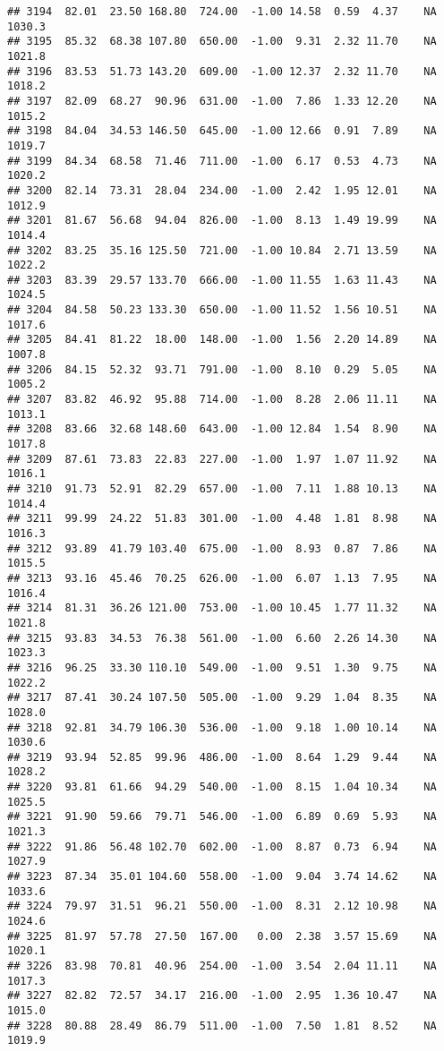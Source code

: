 \documentclass{article}\usepackage{graphicx, color}
\makeatletter
\newenvironment{kframe}{%
 \def\at@end@of@kframe{}%
 \ifinner\ifhmode%
  \def\at@end@of@kframe{\end{minipage}}%
  \begin{minipage}{\columnwidth}%
 \fi\fi%
 \def\FrameCommand##1{\hskip\@totalleftmargin \hskip-\fboxsep
 \colorbox{shadecolor}{##1}\hskip-\fboxsep
     \hskip-\linewidth \hskip-\@totalleftmargin \hskip\columnwidth}%
 \MakeFramed {\advance\hsize-\width
   \@totalleftmargin\z@ \linewidth\hsize
   \@setminipage}}%
 {\par\unskip\endMakeFramed%
 \at@end@of@kframe}
\newenvironment{knitrout}{}{} %
\makeatother
\begin{document}
\begin{knitrout}
\begin{kframe}
\begin{verbatim}
## 3194  82.01  23.50 168.80  724.00  -1.00 14.58  0.59  4.37    NA 1030.3
## 3195  85.32  68.38 107.80  650.00  -1.00  9.31  2.32 11.70    NA 1021.8
## 3196  83.53  51.73 143.20  609.00  -1.00 12.37  2.32 11.70    NA 1018.2
## 3197  82.09  68.27  90.96  631.00  -1.00  7.86  1.33 12.20    NA 1015.2
## 3198  84.04  34.53 146.50  645.00  -1.00 12.66  0.91  7.89    NA 1019.7
## 3199  84.34  68.58  71.46  711.00  -1.00  6.17  0.53  4.73    NA 1020.2
## 3200  82.14  73.31  28.04  234.00  -1.00  2.42  1.95 12.01    NA 1012.9
## 3201  81.67  56.68  94.04  826.00  -1.00  8.13  1.49 19.99    NA 1014.4
## 3202  83.25  35.16 125.50  721.00  -1.00 10.84  2.71 13.59    NA 1022.2
## 3203  83.39  29.57 133.70  666.00  -1.00 11.55  1.63 11.43    NA 1024.5
## 3204  84.58  50.23 133.30  650.00  -1.00 11.52  1.56 10.51    NA 1017.6
## 3205  84.41  81.22  18.00  148.00  -1.00  1.56  2.20 14.89    NA 1007.8
## 3206  84.15  52.32  93.71  791.00  -1.00  8.10  0.29  5.05    NA 1005.2
## 3207  83.82  46.92  95.88  714.00  -1.00  8.28  2.06 11.11    NA 1013.1
## 3208  83.66  32.68 148.60  643.00  -1.00 12.84  1.54  8.90    NA 1017.8
## 3209  87.61  73.83  22.83  227.00  -1.00  1.97  1.07 11.92    NA 1016.1
## 3210  91.73  52.91  82.29  657.00  -1.00  7.11  1.88 10.13    NA 1014.4
## 3211  99.99  24.22  51.83  301.00  -1.00  4.48  1.81  8.98    NA 1016.3
## 3212  93.89  41.79 103.40  675.00  -1.00  8.93  0.87  7.86    NA 1015.5
## 3213  93.16  45.46  70.25  626.00  -1.00  6.07  1.13  7.95    NA 1016.4
## 3214  81.31  36.26 121.00  753.00  -1.00 10.45  1.77 11.32    NA 1021.8
## 3215  93.83  34.53  76.38  561.00  -1.00  6.60  2.26 14.30    NA 1023.3
## 3216  96.25  33.30 110.10  549.00  -1.00  9.51  1.30  9.75    NA 1022.2
## 3217  87.41  30.24 107.50  505.00  -1.00  9.29  1.04  8.35    NA 1028.0
## 3218  92.81  34.79 106.30  536.00  -1.00  9.18  1.00 10.14    NA 1030.6
## 3219  93.94  52.85  99.96  486.00  -1.00  8.64  1.29  9.44    NA 1028.2
## 3220  93.81  61.66  94.29  540.00  -1.00  8.15  1.04 10.34    NA 1025.5
## 3221  91.90  59.66  79.71  546.00  -1.00  6.89  0.69  5.93    NA 1021.3
## 3222  91.86  56.48 102.70  602.00  -1.00  8.87  0.73  6.94    NA 1027.9
## 3223  87.34  35.01 104.60  558.00  -1.00  9.04  3.74 14.62    NA 1033.6
## 3224  79.97  31.51  96.21  550.00  -1.00  8.31  2.12 10.98    NA 1024.6
## 3225  81.97  57.78  27.50  167.00   0.00  2.38  3.57 15.69    NA 1020.1
## 3226  83.98  70.81  40.96  254.00  -1.00  3.54  2.04 11.11    NA 1017.3
## 3227  82.82  72.57  34.17  216.00  -1.00  2.95  1.36 10.47    NA 1015.0
## 3228  80.88  28.49  86.79  511.00  -1.00  7.50  1.81  8.52    NA 1019.9

\end{verbatim}
\end{kframe}
\end{knitrout}
\end{document}
